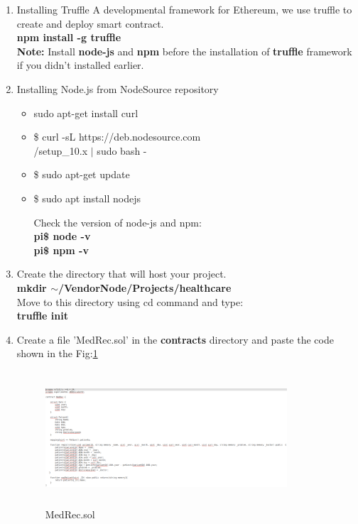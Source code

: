 \documentclass[journal,12pt,twocolumn]{IEEEtran}
\begin{document}
\begin{enumerate}
\item Installing Truffle
A developmental framework for Ethereum, we use truffle to create and deploy smart contract.\\
\textbf{ npm install -g truffle} \\
\textbf{Note:} Install \textbf{node-js} and \textbf{npm} before the installation of \textbf{truffle} framework if you didn't installed earlier.
\item Installing Node.js from NodeSource repository
\begin{itemize}
\item sudo apt-get install curl
\item \$ curl -sL https://deb.nodesource.com\\/setup\_10.x $\mid$ sudo bash -
\item \$ sudo apt-get update
\item  \$ sudo apt install nodejs

Check the version of node-js and npm:\\
\textbf{pi\$ node -v}\\
\textbf{pi\$ npm -v}\\
\end{itemize}

 
\item Create the directory that will host your project.\\
\textbf{ mkdir $\sim$/VendorNode/Projects/healthcare}\\
Move to this directory using cd command and type:\\
\textbf{truffle init} 

\item Create a file 'MedRec.sol' in the \textbf{contracts} directory and paste the code shown in the Fig:\ref{fig:4}

 \begin{figure}[H]
  \includegraphics[width=9cm, height=5cm]{smartt.png}
  \caption{MedRec.sol}
  \label{fig:4}
\end{figure} 


\end{enumerate}
\end{document}
